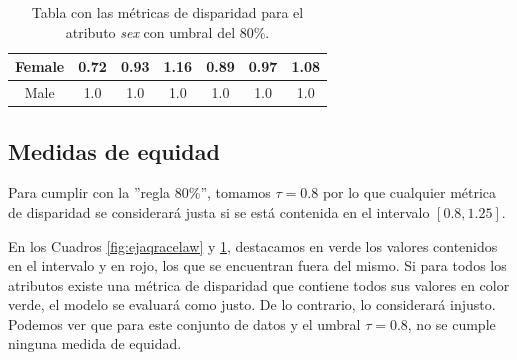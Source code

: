 \begin{table}[h]
{\begin{tabular}{ccccccc}
\multicolumn{1}{|c|}{Female}                                                             & \multicolumn{1}{c|}{{\color[HTML]{FE0000} 0.72}}                                      & \multicolumn{1}{c|}{{\color[HTML]{32CB00} 0.93}}                                        & \multicolumn{1}{c|}{{\color[HTML]{32CB00} 1.16}}                                      & \multicolumn{1}{c|}{{\color[HTML]{32CB00} 0.89}}                                      & \multicolumn{1}{c|}{{\color[HTML]{32CB00} 0.97}}                                      & \multicolumn{1}{c|}{{\color[HTML]{32CB00} 1.08}}                                      \\ \hline
\multicolumn{1}{|c|}{Male}                                                               & \multicolumn{1}{c|}{{\color[HTML]{3166FF} 1.0}}                                       & \multicolumn{1}{c|}{{\color[HTML]{3166FF} 1.0}}                                         & \multicolumn{1}{c|}{{\color[HTML]{3166FF} 1.0}}                                       & \multicolumn{1}{c|}{{\color[HTML]{3166FF} 1.0}}                                       & \multicolumn{1}{c|}{{\color[HTML]{3166FF} 1.0}}                                       & \multicolumn{1}{c|}{{\color[HTML]{3166FF} 1.0}}                                       \\ \hline
\end{tabular}
}
	\caption{Tabla con las métricas de disparidad para el atributo \textit{sex} con umbral del 80\%.}
    \label{fig:ejaqsexlaw}
\end{table}

\subsection*{Medidas de equidad}

Para cumplir con la ''regla 80\%'', tomamos $\tau=0.8$ por lo que cualquier métrica de disparidad se considerará justa si se está contenida en el intervalo $[0.8,1.25]$.

En los Cuadros \ref{fig:ejaqracelaw} y \ref{fig:ejaqsexlaw}, destacamos en verde los valores contenidos en el intervalo y en rojo, los que se encuentran fuera del mismo. Si para todos los atributos existe una métrica de disparidad que contiene todos sus valores en color verde, el modelo se evaluará como justo. De lo contrario, lo considerará injusto. Podemos ver que para este conjunto de datos y el umbral $\tau=0.8$, no se cumple ninguna medida de equidad.\\

